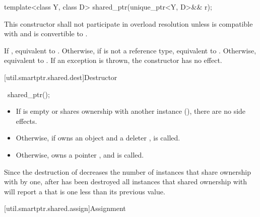 %
%
\begin{itemdecl}
template<class Y, class D> shared_ptr(unique_ptr<Y, D>&& r);
\end{itemdecl}

\begin{itemdescr}
\pnum
\remarks
This constructor shall not participate in overload resolution
unless  is compatible with  and
 is convertible to .

\pnum
\effects
If , equivalent to .
Otherwise, if  is not a reference type,
equivalent to .
Otherwise, equivalent to .
If an exception is thrown, the constructor has no effect.
\end{itemdescr}

[util.smartptr.shared.dest]{Destructor}

%
\begin{itemdecl}
~shared_ptr();
\end{itemdecl}

\begin{itemdescr}
\pnum
\effects
\begin{itemize}
\item If  is empty or shares ownership with another
 instance (), there are no side effects.

\item
Otherwise, if  owns an object
 and a deleter ,  is called.

\item Otherwise,  owns a pointer ,
and  is called.
\end{itemize}
\end{itemdescr}

\pnum
\begin{note}
Since the destruction of 
decreases the number of instances that share ownership with 
by one,
after  has been destroyed
all  instances that shared ownership with
 will report a  that is one less
than its previous value.
\end{note}

[util.smartptr.shared.assign]{Assignment}

